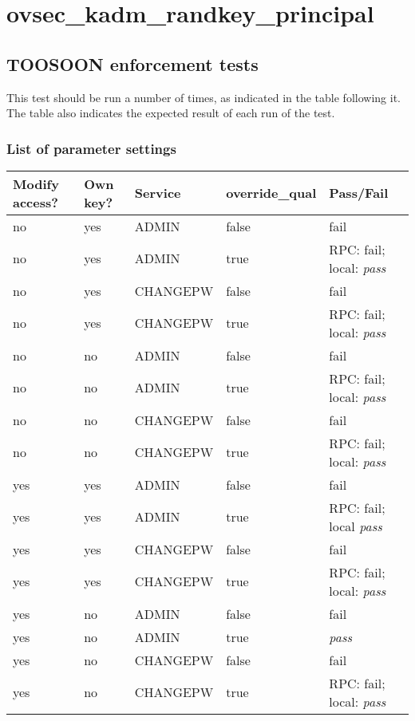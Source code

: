 \section{ovsec_kadm_randkey_principal}

\subsection{TOOSOON enforcement tests}

This test should be run a number of times, as indicated in the table
following it.  The table also indicates the expected result of each
run of the test.


\subsubsection{List of parameter settings}

\begin{tabular}{lllll}
Modify access? & Own key? & Service & override_qual & Pass/Fail \\ \hline
no & yes & ADMIN & false & fail \\
no & yes & ADMIN & true & RPC: fail; local: {\em pass} \\
no & yes & CHANGEPW & false & fail \\
no & yes & CHANGEPW & true & RPC: fail; local: {\em pass} \\
no & no & ADMIN & false & fail \\
no & no & ADMIN & true & RPC: fail; local: {\em pass} \\
no & no & CHANGEPW & false & fail \\
no & no & CHANGEPW & true & RPC: fail; local: {\em pass} \\
yes & yes & ADMIN & false & fail \\
yes & yes & ADMIN & true & RPC: fail; local {\em pass} \\
yes & yes & CHANGEPW & false & fail \\
yes & yes & CHANGEPW & true & RPC: fail; local: {\em pass} \\
yes & no & ADMIN & false & fail \\
yes & no & ADMIN & true & {\em pass} \\
yes & no & CHANGEPW & false & fail \\
yes & no & CHANGEPW & true & RPC: fail; local: {\em pass}
\end{tabular}

